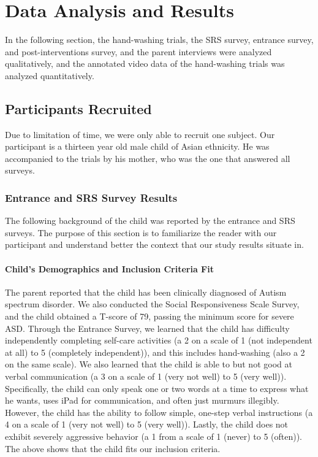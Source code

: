 \section{Data Analysis and Results}
\label{Sec:DataAnalysisAndResults}
In the following section, the hand-washing trials, the SRS survey, entrance survey, and post-interventions survey, and the parent interviews were analyzed qualitatively, and the annotated video data of the hand-washing trials was analyzed quantitatively.

\subsection{Participants Recruited}
Due to limitation of time, we were only able to recruit one subject.  Our participant is a thirteen year old male child of Asian ethnicity.  He was accompanied to the trials by his mother, who was the one that answered all surveys.

\subsubsection{Entrance and SRS Survey Results}
The following background of the child was reported by the entrance and SRS surveys.  The purpose of this section is to familiarize the reader with our participant and understand better the context that our study results situate in.

\paragraph{Child's Demographics and Inclusion Criteria Fit}
The parent reported that the child has been clinically diagnosed of Autism spectrum disorder.  We also conducted the Social Responsiveness Scale Survey, and the child obtained a T-score of 79, passing the minimum score for severe ASD.  Through the Entrance Survey, we learned that the child has difficulty independently completing self-care activities (a 2 on a scale of 1 (not independent at all) to 5 (completely independent)), and this includes hand-washing (also a 2 on the same scale).  We also learned that the child is able to but not good at verbal communication (a 3 on a scale of 1 (very not well) to 5 (very well)).  Specifically, the child can only speak one or two words at a time to express what he wants, uses iPad for communication, and often just murmurs illegibly.  However, the child has the ability to follow simple, one-step verbal instructions (a 4 on a scale of 1 (very not well) to 5 (very well)).  Lastly, the child does not exhibit severely aggressive behavior (a 1 from a scale of 1 (never) to 5 (often)).  The above shows that the child fits our inclusion criteria.

